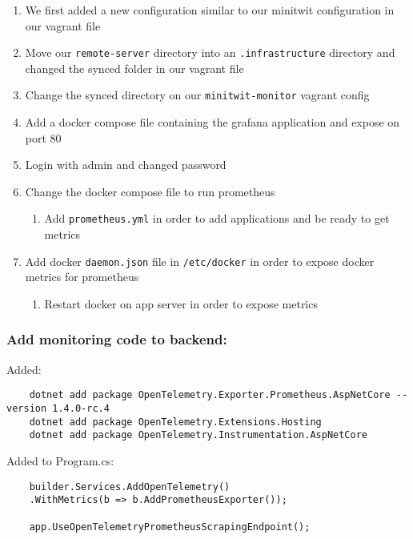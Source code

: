 \begin{enumerate}
    \item We first added a new configuration similar to our minitwit configuration in our vagrant file
    \item Move our \texttt{remote-server} directory into an \texttt{.infrastructure} directory and changed the synced folder in our vagrant file
    \item Change the synced directory on our \texttt{minitwit-monitor} vagrant config
    \item Add a docker compose file containing the grafana application and expose on port 80
    \item Login with admin and changed password
    \item Change the docker compose file to run prometheus
    \begin{enumerate}
        \item Add \texttt{prometheus.yml} in order to add applications and be ready to get metrics
    \end{enumerate}

    \item Add docker \texttt{daemon.json} file in \texttt{/etc/docker} in order to expose docker metrics for prometheus

    \begin{enumerate}
        \item Restart docker on app server in order to expose metrics
    \end{enumerate}
\end{enumerate}

\subsubsection{Add monitoring code to backend:}
\label{log:add-monitoring-code-to-backend}

Added:

\begin{verbatim}
    dotnet add package OpenTelemetry.Exporter.Prometheus.AspNetCore --version 1.4.0-rc.4
    dotnet add package OpenTelemetry.Extensions.Hosting
    dotnet add package OpenTelemetry.Instrumentation.AspNetCore
\end{verbatim}

Added to Program.cs:

\begin{verbatim}
    builder.Services.AddOpenTelemetry()
    .WithMetrics(b => b.AddPrometheusExporter());

    app.UseOpenTelemetryPrometheusScrapingEndpoint();
\end{verbatim}

